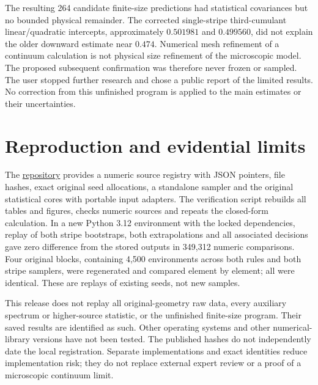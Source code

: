 \documentclass[10pt,a4paper]{article}
\begin{document}
The resulting 264 candidate finite-size predictions had statistical
covariances but no bounded physical remainder. The corrected single-stripe
third-cumulant linear/quadratic intercepts, approximately \(0.501981\) and
\(0.499560\), did not explain the older downward estimate near \(0.474\).
Numerical mesh refinement of a continuum calculation is not physical
size refinement of the microscopic model.
The proposed subsequent confirmation was therefore never frozen or sampled.
The user stopped further research and chose a public report of the limited
results. No correction from this unfinished program is applied to the
main estimates or their uncertainties.

\section{Reproduction and evidential limits}
The \href{https://github.com/SHIN09-git/mirror3d-partial-ports/releases/tag/v1.0.0}{repository} provides a numeric source registry with JSON pointers,
file hashes, exact original seed allocations, a standalone sampler and
the original statistical cores with portable input adapters.
The verification script rebuilds all tables and figures, checks numeric
sources and repeats the closed-form calculation.
In a new Python 3.12 environment with the locked dependencies, replay of
both stripe bootstraps, both extrapolations and all associated decisions
gave zero difference from the stored outputs in 349,312 numeric comparisons.
Four original blocks, containing 4,500 environments across both rules and
both stripe samplers, were regenerated and compared element by element;
all were identical. These are replays of existing seeds, not new samples.

This release does not replay all original-geometry raw data, every auxiliary
spectrum or higher-source statistic, or the unfinished finite-size program.
Their saved results are identified as such. Other operating systems and
other numerical-library versions have not been tested.
The published hashes do not independently date the local registration.
Separate implementations and exact identities reduce implementation risk;
they do not replace external expert review or a proof of a microscopic
continuum limit.


\end{document}
